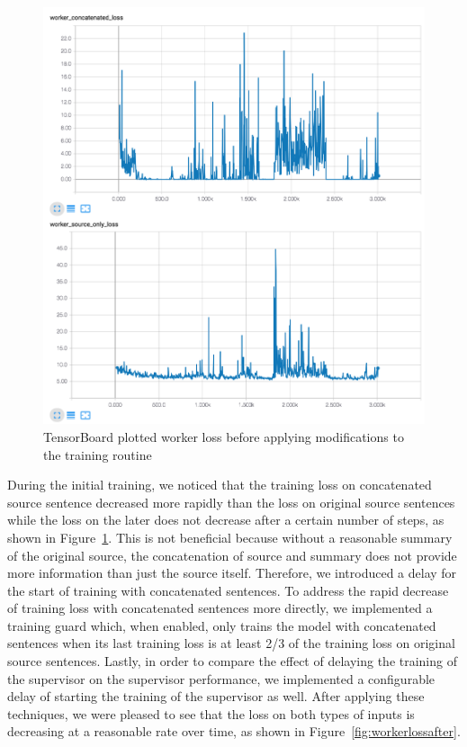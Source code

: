 \documentclass[letterpaper]{article} %
\begin{document}
\begin{figure}[h]
	\includegraphics[scale=0.3]{worker_loss_before}
	\centering
	\caption{TensorBoard \cite{tensorflow2015-whitepaper} plotted worker loss before applying modifications to the training routine}
	\label{fig:workerlossbefore}
\end{figure}

During the initial training, we noticed that the training loss on concatenated source sentence decreased more rapidly than the loss on original source sentences while the loss on the later does not decrease after a certain number of steps, as shown in Figure~\ref{fig:workerlossbefore}. This is not beneficial because without a reasonable summary of the original source, the concatenation of source and summary does not provide more information than just the source itself. Therefore, we introduced a delay for the start of training with concatenated sentences. To address the rapid decrease of training loss with concatenated sentences more directly, we implemented a training guard which, when enabled, only trains the model with concatenated sentences when its last training loss is at least 2/3 of the training loss on original source sentences. Lastly, in order to compare the effect of delaying the training of the supervisor on the supervisor performance, we implemented a configurable delay of starting the training of the supervisor as well. After applying these techniques, we were pleased to see that the loss on both types of inputs is decreasing at a reasonable rate over time, as shown in Figure~\ref{fig:workerlossafter}.
\end{document}
